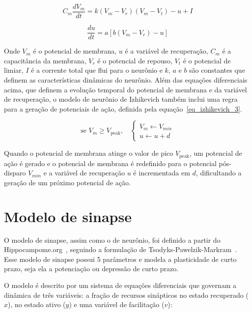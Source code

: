 
\begin{equation}
\label{eq_izhikevich_1}
C_m \frac{dV_m}{dt} = k (V_m - V_r)(V_m - V_t) - u + I
\end{equation}

\begin{equation}
\label{eq_izhikevich_2}
\frac{du}{dt} = a [b(V_m-V_r) - u]
\end{equation}

Onde $V_m$ é o potencial de membrana, $u$ é a variável de recuperação, $C_m$ é a capacitância da membrana, $V_r$ é o
potencial de repouso, $V_t$ é o potencial de limiar, $I$ é a corrente total que flui para o neurônio e $k$, $a$ e $b$ são
constantes que definem as características dinâmicas do neurônio. Além das equações diferenciais acima, que definem a evolução
temporal do potencial de membrana e da variável de recuperação, o modelo de neurônio de Izhikevich também inclui uma regra para
a geração de potenciais de ação, definida pela equação~\ref{eq_izhikevich_3}.

\begin{equation}
\label{eq_izhikevich_3}
\text{se } V_m \geq V_{\text{peak}}, \quad
\begin{cases}
V_m \gets V_{min} \\
u \gets u + d
\end{cases}
\end{equation}

Quando o potencial de membrana atinge o valor de pico $V_{\text{peak}}$, um potencial de ação é gerado e o potencial de membrana é
redefinido para o potencial pós-disparo $V_{min}$ e a variável de recuperação $u$ é incrementada em $d$, dificultando a geração de
um próximo potencial de ação.



\section{Modelo de sinapse}

O modelo de sinapse, assim como o de neurônio, foi definido a partir do Hippocampome.org~\cite{wheelerHippocampomeorg2023},
seguindo a formulação de Tsodyks-Pawelzik-Markram~\cite{tsodyksNeural1998}. Esse modelo de sinapse possui 5 parâmetros e modela a
plasticidade de curto prazo, seja ela a potenciação ou depressão de curto prazo.

O modelo é descrito por um sistema de equações diferenciais que governam a dinâmica de três variáveis: a fração de recursos sinápticos no estado recuperado ($x$), no estado ativo ($y$) e uma variável de facilitação ($v$):

